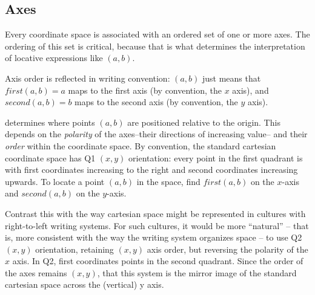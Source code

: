 \documentclass[reqno,12pt]{tufte-handout}
\numberwithin{equation}{subsection}
\numberwithin{equation}{subsection}
\newcommand\cspace{coordinate space}
\begin{document}
  \subsection{Axes}
  \label{subs:orientation}

  Every \cspace{} is associated with an ordered set of one or more
  axes.  The ordering of this set is critical, because that is what
  determines the interpretation of locative expressions like
  \((a,b)\).

  Axis order is reflected in writing convention: \((a,b)\) just means
  that \(first(a,b)=a\) maps to the first axis (by convention, the $x$
  axis), and \(second(a,b)=b\) maps to the second axis (by convention,
  the $y$ axis).

  \newthought{The orientation of a \cspace{}} determines where points
  \((a,b)\) are positioned relative to the origin.  This depends on the
  \textit{polarity} of the axes--their directions of increasing value--
  and their \textit{order} within the \cspace{}.  By convention, the
  standard cartesian \cspace{} has Q1 \((x,y)\) orientation: every point in the first quadrant is
  with first coordinates increasing to the right and second
  coordinates increasing upwards.  To locate a point \((a,b)\) in the
  space, find \(first(a,b)\) on the $x$-axis and \(second(a,b)\) on
  the \(y\)-axis.

  Contrast this with the way cartesian space might be represented in
  cultures with right-to-left writing systems.  For such cultures, it
  would be more ``natural'' -- that is, more consistent with the way the
  writing system organizes space -- to use Q2 \((x,y)\) orientation,
  retaining \((x,y)\) axis order, but reversing the polarity of the
  \(x\) axis.  In Q2, first coordinates%
  points in the second quadrant.  Since the order of the axes remains
  \((x,y)\), that this system is the mirror image of the standard
  cartesian space across the (vertical) y axis.
\end{document}
